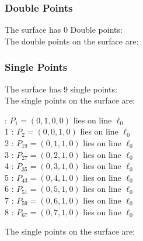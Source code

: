 \documentclass{article}
\begin{document}
{\subsubsection*{Double Points}
The surface has 0 Double points:\\
The double points on the surface are:\\
\begin{multicols}{2}
\noindent
\end{multicols}
\subsubsection*{Single Points}
The surface has 9 single points:\\
The single points on the surface are:\\
\begin{multicols}{2}
 : $P_{1}=( 0, 1, 0, 0 )$ lies on line $\ell_{0}$\\
1 : $P_{2}=( 0, 0, 1, 0 )$ lies on line $\ell_{0}$\\
2 : $P_{19}=( 0, 1, 1, 0 )$ lies on line $\ell_{0}$\\
3 : $P_{27}=( 0, 2, 1, 0 )$ lies on line $\ell_{0}$\\
4 : $P_{35}=( 0, 3, 1, 0 )$ lies on line $\ell_{0}$\\
5 : $P_{43}=( 0, 4, 1, 0 )$ lies on line $\ell_{0}$\\
6 : $P_{51}=( 0, 5, 1, 0 )$ lies on line $\ell_{0}$\\
7 : $P_{59}=( 0, 6, 1, 0 )$ lies on line $\ell_{0}$\\
8 : $P_{67}=( 0, 7, 1, 0 )$ lies on line $\ell_{0}$\\
\end{multicols}
The single points on the surface are:\\
}
\end{document}
